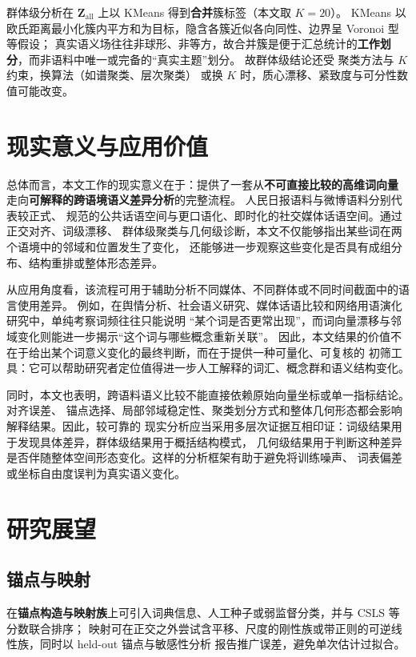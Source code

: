 \documentclass[withoutpreface]{cumcmthesis}
\begin{document}
群体级分析在 $\mathbf{Z}_{\mathrm{all}}$ 上以 KMeans 得到\textbf{合并}簇标签（本文取 $K{=}20$）。
KMeans 以欧氏距离最小化簇内平方和为目标，隐含各簇近似各向同性、边界呈 Voronoi 型等假设；
真实语义场往往非球形、非等方，故合并簇是便于汇总统计的\textbf{工作划分}，而非语料中唯一或完备的“真实主题”划分。
故群体级结论还受 聚类方法与 $K$ 约束，换算法（如谱聚类、层次聚类）
或换 $K$ 时，质心漂移、紧致度与可分性数值可能改变。


\section{现实意义与应用价值}

总体而言，本文工作的现实意义在于：提供了一套从\textbf{不可直接比较的高维词向量}
走向\textbf{可解释的跨语境语义差异分析}的完整流程。 人民日报语料与微博语料分别代表较正式、
规范的公共话语空间与更口语化、即时化的社交媒体话语空间。通过正交对齐、词级漂移、
群体级聚类与几何级诊断，本文不仅能够指出某些词在两个语境中的邻域和位置发生了变化，
还能够进一步观察这些变化是否具有成组分布、结构重排或整体形态差异。

从应用角度看，该流程可用于辅助分析不同媒体、不同群体或不同时间截面中的语言使用差异。
例如，在舆情分析、社会语义研究、媒体话语比较和网络用语演化研究中，单纯考察词频往往只能说明
“某个词是否更常出现”，而词向量漂移与邻域变化则能进一步揭示“这个词与哪些概念重新关联”。
因此，本文结果的价值不在于给出某个词意义变化的最终判断，而在于提供一种可量化、可复核的
初筛工具：它可以帮助研究者定位值得进一步人工解释的词汇、概念群和语义结构变化。

同时，本文也表明，跨语料语义比较不能直接依赖原始向量坐标或单一指标结论。对齐误差、
锚点选择、局部邻域稳定性、聚类划分方式和整体几何形态都会影响解释结果。因此，较可靠的
现实分析应当采用多层次证据互相印证：词级结果用于发现具体差异，群体级结果用于概括结构模式，
几何级结果用于判断这种差异是否伴随整体空间形态变化。这样的分析框架有助于避免将训练噪声、
词表偏差或坐标自由度误判为真实语义变化。

\section{研究展望}

\subsection{锚点与映射}
在\textbf{锚点构造与映射族}上可引入词典信息、人工种子或弱监督分类，并与 CSLS 等分数联合排序；
映射可在正交之外尝试含平移、尺度的刚性族或带正则的可逆线性族，同时以 held-out 锚点与敏感性分析
报告推广误差，避免单次估计过拟合。
\end{document}
